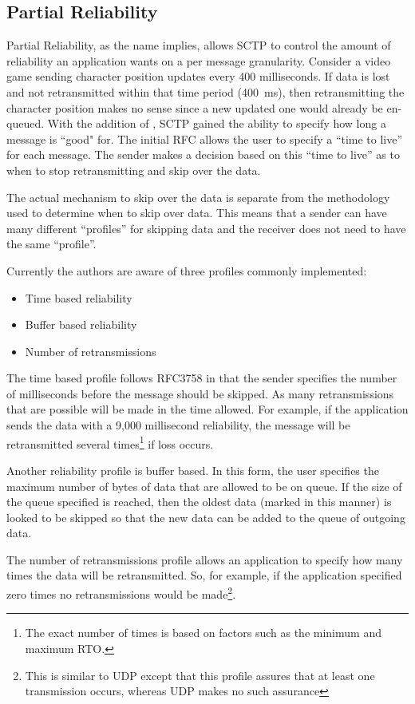 \documentclass[conference]{IEEEtran}
\begin{document}
\subsection{Partial Reliability}
\label{prsctp}
Partial Reliability, as the name implies, allows SCTP to control the 
amount of reliability an application wants on a per message granularity.
Consider a video game sending character position updates every 400 milliseconds.
If data is lost and not retransmitted within that time period (400~ms), then
retransmitting the character position makes no sense since a new
updated one would already be en-queued. With the addition of \cite{rfc3758}, SCTP
gained the ability to specify how long a message is ``good" for.  The initial
RFC allows the user to specify a ``time to live'' for each message. The 
sender makes a decision based on this ``time to live'' as to when to stop retransmitting and
skip over the data. 

The actual mechanism to skip over the data is separate from the
methodology used to determine when to skip over data. This means that
a sender can have many different ``profiles'' for skipping data and the
receiver does not need to have the same ``profile''.

Currently the authors are aware of three profiles commonly implemented:
\begin{itemize}
  \item Time based reliability
  \item Buffer based reliability
  \item Number of retransmissions
\end{itemize}
The time based profile follows RFC3758 in that the sender specifies
the number of milliseconds before the message should be skipped.  As
many retransmissions that are possible will be made in the time allowed.
For example, if the application sends the data with a 9,000 millisecond
reliability, the message will be retransmitted several times\footnote{The exact
number of times is based on factors such as the minimum and maximum RTO.} if loss occurs.

Another reliability profile is buffer based. In this form, the user specifies the maximum
number of bytes of data that are allowed to be on queue. If the size of the queue 
specified is reached, then the oldest data (marked in this manner) is looked to be
skipped so that the new data can be added to the queue of outgoing data.

The number of retransmissions profile allows an application to specify how many
times the data will be retransmitted. So, for example, if the application specified
zero times no retransmissions would be made\footnote{This is similar to UDP
except that this profile assures that at least one transmission occurs, whereas
UDP makes no such assurance}.
\end{document}
